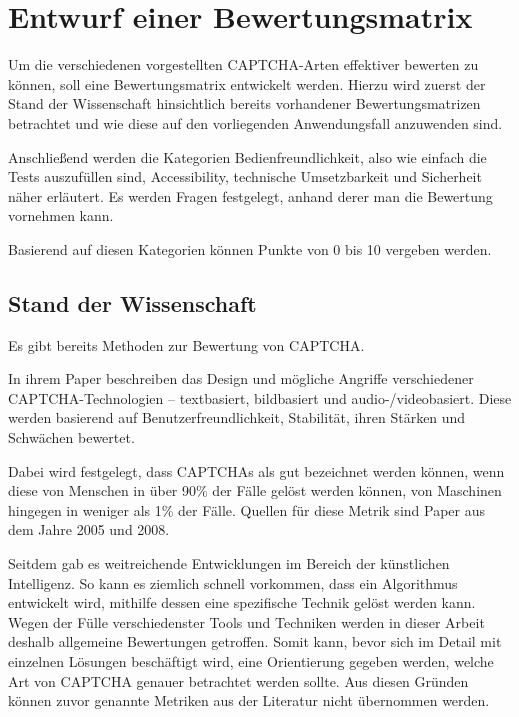 \chapter{Entwurf einer Bewertungsmatrix}
\label{ch:matrix}

Um die verschiedenen vorgestellten CAPTCHA-Arten effektiver bewerten zu können, soll eine Bewertungsmatrix entwickelt werden.
Hierzu wird zuerst der Stand der Wissenschaft hinsichtlich bereits vorhandener Bewertungsmatrizen betrachtet
und wie diese auf den vorliegenden Anwendungsfall anzuwenden sind.

Anschließend werden die Kategorien Bedienfreundlichkeit, also wie einfach die Tests auszufüllen sind, Accessibility, technische Umsetzbarkeit
und Sicherheit näher erläutert.
Es werden Fragen festgelegt, anhand derer man die Bewertung vornehmen kann.

Basierend auf diesen Kategorien können Punkte von 0 bis 10 vergeben werden.

\section{Stand der Wissenschaft}
\label{ch:matrix:sdw}

Es gibt bereits Methoden zur Bewertung von CAPTCHA.

In ihrem Paper  beschreiben \citeauthor{surveyofresearch} das Design
und mögliche Angriffe verschiedener CAPTCHA-Technologien – textbasiert, bildbasiert und audio-/videobasiert.
Diese werden basierend auf Benutzerfreundlichkeit, Stabilität, ihren Stärken und Schwächen bewertet.  

Dabei wird festgelegt, dass CAPTCHAs als gut bezeichnet werden können, wenn diese von Menschen in über 90\% der Fälle gelöst werden können,
von Maschinen hingegen in weniger als 1\% der Fälle.
Quellen für diese Metrik sind Paper aus dem Jahre 2005 und 2008. \cite[p.75]{surveyofresearch}

Seitdem gab es weitreichende Entwicklungen im Bereich der künstlichen Intelligenz.
So kann es ziemlich schnell vorkommen, dass ein Algorithmus entwickelt wird, mithilfe dessen eine spezifische Technik gelöst werden kann.
Wegen der Fülle verschiedenster Tools und Techniken werden in dieser Arbeit deshalb allgemeine Bewertungen getroffen.
Somit kann, bevor sich im Detail mit einzelnen Lösungen beschäftigt wird, eine Orientierung gegeben werden, welche Art von CAPTCHA genauer betrachtet werden sollte.
Aus diesen Gründen können zuvor genannte Metriken aus der Literatur nicht übernommen werden.

